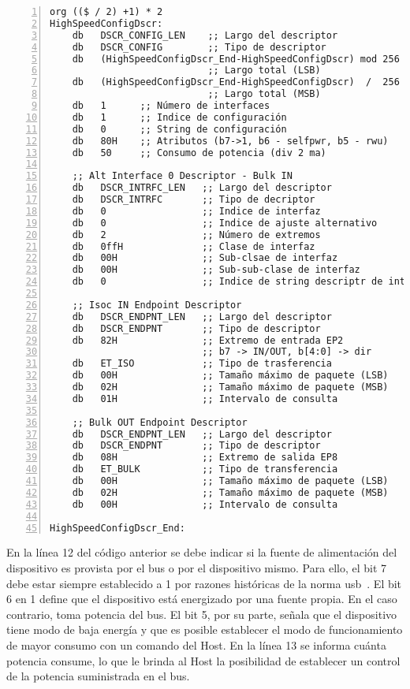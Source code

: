	\begin{lstlisting}[language={[x86masm]Assembler},backgroundcolor=\color{gray!30},numbers=left]
org (($ / 2) +1) * 2
HighSpeedConfigDscr:
	db   DSCR_CONFIG_LEN	;; Largo del descriptor
	db   DSCR_CONFIG        ;; Tipo de descriptor
	db   (HighSpeedConfigDscr_End-HighSpeedConfigDscr) mod 256
							;; Largo total (LSB)
	db   (HighSpeedConfigDscr_End-HighSpeedConfigDscr)  /  256 
							;; Largo total (MSB)
	db   1      ;; Número de interfaces
	db   1      ;; Indice de configuración
	db   0		;; String de configuración
	db   80H	;; Atributos (b7->1, b6 - selfpwr, b5 - rwu)
	db   50		;; Consumo de potencia (div 2 ma)
	
	;; Alt Interface 0 Descriptor - Bulk IN
	db   DSCR_INTRFC_LEN   ;; Largo del descriptor
	db   DSCR_INTRFC       ;; Tipo de decriptor
	db   0                 ;; Indice de interfaz
	db   0                 ;; Indice de ajuste alternativo
	db   2                 ;; Número de extremos
	db   0ffH              ;; Clase de interfaz
	db   00H               ;; Sub-clsae de interfaz
	db   00H               ;; Sub-sub-clase de interfaz
	db   0                 ;; Indice de string descriptr de interfaz
	
	;; Isoc IN Endpoint Descriptor 
	db   DSCR_ENDPNT_LEN   ;; Largo del descriptor
	db   DSCR_ENDPNT       ;; Tipo de descriptor
	db   82H               ;; Extremo de entrada EP2
						   ;; b7 -> IN/OUT, b[4:0] -> dir
	db   ET_ISO            ;; Tipo de trasferencia
	db   00H               ;; Tamaño máximo de paquete (LSB)
	db   02H               ;; Tamaño máximo de paquete (MSB) 
	db   01H               ;; Intervalo de consulta
	
	;; Bulk OUT Endpoint Descriptor
	db   DSCR_ENDPNT_LEN   ;; Largo del descriptor
	db   DSCR_ENDPNT       ;; Tipo de descriptor
	db   08H               ;; Extremo de salida EP8
	db   ET_BULK           ;; Tipo de transferencia
	db   00H               ;; Tamaño máximo de paquete (LSB)
	db   02H               ;; Tamaño máximo de paquete (MSB)
	db   00H               ;; Intervalo de consulta
	
HighSpeedConfigDscr_End:
	\end{lstlisting}
	
	En la línea 12 del código anterior se debe indicar si la fuente de alimentación del dispositivo es provista por el bus o por el dispositivo mismo. Para ello, el bit 7 debe estar siempre establecido a 1 por razones históricas de la norma \acrshort{usb}~\cite{USBspec}. El bit 6 en 1 define que el dispositivo está energizado por una fuente propia. En el caso contrario, toma potencia del bus. El bit 5, por su parte, señala que el dispositivo tiene modo de baja energía y que es posible establecer el modo de funcionamiento de mayor consumo con un comando del Host. En la línea 13 se informa cuánta potencia consume, lo que le brinda al Host la posibilidad de establecer un control de la potencia suministrada en el bus.
	
